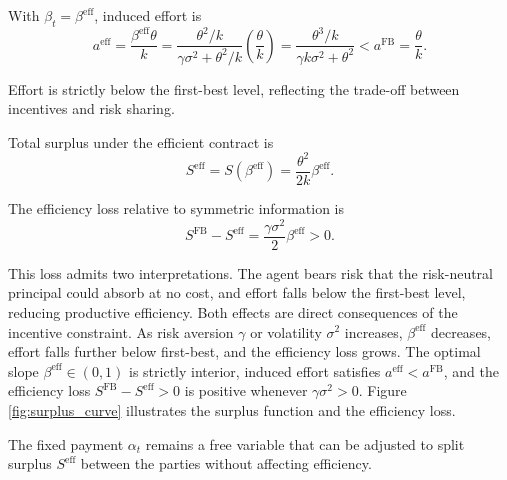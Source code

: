 \documentclass{article}
\theoremstyle{definition}
\theoremstyle{plain}
\begin{document}
With $\beta_t = \beta^{\text{eff}}$, induced effort is
\[
a^{\text{eff}} = \frac{\beta^{\text{eff}} \theta}{k} = \frac{\theta^2/k}{\gamma \sigma^2 + \theta^2/k} \left(\frac{\theta}{k}\right) = \frac{\theta^3/k}{\gamma k \sigma^2 + \theta^2} < a^{\text{FB}} = \frac{\theta}{k}.
\]

Effort is strictly below the first-best level, reflecting the trade-off between incentives and risk sharing.

Total surplus under the efficient contract is
\[
S^{\text{eff}} = S(\beta^{\text{eff}}) = \frac{\theta^2}{2k} \beta^{\text{eff}}.
\]

The efficiency loss relative to symmetric information is
\[
S^{\text{FB}} - S^{\text{eff}} = \frac{\gamma \sigma^2}{2}\beta^{\text{eff}} > 0.
\]

This loss admits two interpretations. The agent bears risk that the risk-neutral principal could absorb at no cost, and effort falls below the first-best level, reducing productive efficiency. Both effects are direct consequences of the incentive constraint. As risk aversion $\gamma$ or volatility $\sigma^2$ increases, $\beta^{\text{eff}}$ decreases, effort falls further below first-best, and the efficiency loss grows. The optimal slope $\beta^{\text{eff}} \in (0,1)$ is strictly interior, induced effort satisfies $a^{\text{eff}} < a^{\text{FB}}$, and the efficiency loss $S^{\text{FB}} - S^{\text{eff}} > 0$ is positive whenever $\gamma\sigma^2 > 0$. Figure \ref{fig:surplus_curve} illustrates the surplus function and the efficiency loss.

The fixed payment $\alpha_t$ remains a free variable that can be adjusted to split surplus $S^{\text{eff}}$ between the parties without affecting efficiency.
\end{document}

